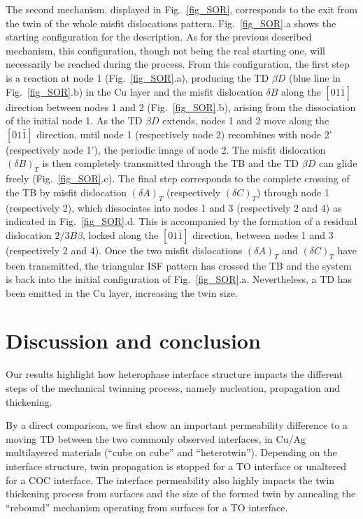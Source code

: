 \documentclass[final,3p,times,twocolumn]{elsarticle}
\begin{document}
The second mechanism, displayed in Fig.~\ref{fig_SOR}, corresponds to the exit from the twin of the whole misfit dislocations pattern. Fig.~\ref{fig_SOR}.a shows the starting configuration for the description. As for the previous described mechanism, this configuration, though not being the real starting one, will necessarily be reached during the process. From this configuration, the first step is a reaction at node 1 (Fig.~\ref{fig_SOR}.a), producing the TD $\beta D$ (blue line in Fig.~\ref{fig_SOR}.b) in the Cu layer and the misfit dislocation $\delta B$ along the $\left[ 01\bar{1} \right]$ direction between nodes 1 and 2 (Fig.~\ref{fig_SOR}.b), arising from the dissociation of the initial node 1. As the TD $\beta D$ extends, nodes 1 and 2 move along the $\left[ 01\bar{1} \right]$ direction, until node 1 (respectively node 2) recombines with node 2' (respectively node 1'), the periodic image of node 2. The misfit dislocation $(\delta B)_{T}$ is then completely transmitted through the TB and the TD $\beta D$ can glide freely (Fig.~\ref{fig_SOR}.c). The final step corresponds to the complete crossing of the TB by misfit dislocation $(\delta A)_{T}$ (respectively $(\delta C)_{T}$) through node 1 (respectively 2), which dissociates into nodes 1 and 3 (respectively 2 and 4) as indicated in Fig.~\ref{fig_SOR}.d. This is accompanied by the formation of a residual dislocation $2/3 B\beta$, locked along the $\left[ 01\bar{1} \right]$ direction, between nodes 1 and 3 (respectively 2 and 4). Once the two misfit dislocations $(\delta A)_{T}$ and $(\delta C)_{T}$ have been transmitted, the triangular ISF pattern has crossed the TB and the system is back into the initial configuration of Fig.~\ref{fig_SOR}.a. Nevertheless, a TD has been emitted in the Cu layer, increasing the twin size.

\section{Discussion and conclusion}
\label{part_conclusion}

Our results highlight how heterophase interface structure impacts the different steps of the mechanical twinning process, namely nucleation, propagation and thickening. 

By a direct comparison, we first show an important permeability difference to a moving TD between the two commonly observed interfaces, in Cu/Ag multilayered materials (``cube on cube'' and ``heterotwin''). Depending on the interface structure, twin propagation is stopped for a TO interface or unaltered for a COC interface. The interface permeability also highly impacts the twin thickening process from surfaces and the size of the formed twin by annealing the ``rebound'' mechanism operating from surfaces for a TO interface. 
\end{document}

